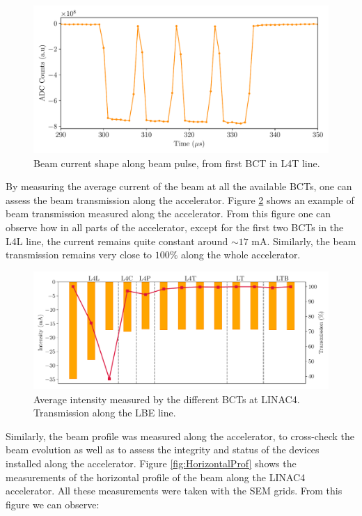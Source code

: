 \begin{figure}
    \centering
    \includegraphics[width=0.7\columnwidth]{IntensityVStime/IntensityVStime.pdf}
    \caption[The LOF caption]{Beam current shape along beam pulse, from first BCT in L4T line.}
    \label{fig:BCTwithTime}
\end{figure}

By measuring the average current of the beam at all the available BCTs, one can assess the beam transmission along the accelerator. Figure \ref{fig:BeamTrans} shows an example of beam transmission measured along the accelerator. From this figure one can observe how in all parts of the accelerator, except for the first two BCTs in the L4L line, the current remains quite constant around $\sim 17$ \si[]{\milli \ampere}.  Similarly, the beam transmission remains very close to $100 \%$ along the whole accelerator. 

\begin{figure}
    \centering
    \includegraphics[width=0.9\columnwidth]{BCT_Transmission/TransmissionBCT.pdf}
    \caption{Average intensity measured by the different BCTs at LINAC4. Transmission along the LBE line.}
    \label{fig:BeamTrans}
\end{figure}

Similarly, the beam profile was measured along the accelerator, to cross-check the beam evolution as well as to assess the integrity and status of the devices installed along the accelerator.  Figure \ref{fig:HorizontalProf} shows the measurements of the horizontal profile of the beam along the LINAC4 accelerator. All these measurements were taken with the SEM grids. From this figure we can observe:

